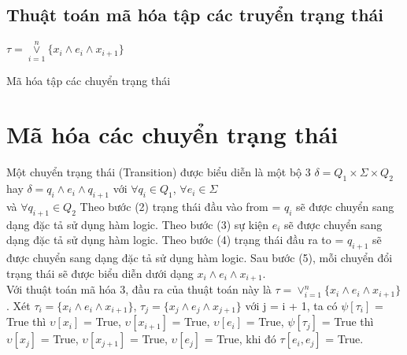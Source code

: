 \documentclass[a4paper,13pt,oneside,openany]{book}
\newenvironment{megaalgorithm}[1][htb]
{\renewcommand{\algorithmcfname}{Thuật toán}%
	\begin{algorithm}[#1]%
}{\end{algorithm}}
\begin{document}
\begin{flushleft}
		\subsection{Thuật toán mã hóa tập các truyển trạng thái}
		\begin{megaalgorithm}[H]
			\SetAlgoLined
			\DontPrintSemicolon
				
			\Return $\tau = \overset{n}{\underset{i=1}{\lor}} \{x_i \land e_i \land x_{i+1}\}$
				
			\caption{Mã hóa tập các chuyển trạng thái}
		\end{megaalgorithm}
		\section{Mã hóa các chuyển trạng thái}
		Một chuyển trạng thái (Transition) được biểu diễn là một bộ 3 $\delta = Q_{1} \times \Sigma \times Q_{2}$ hay $\delta = q_{i} \land e_i \land q_{i+1}$ với $\forall q_{i} \in Q_{1}$, $\forall e_{i} \in \Sigma$\\ và $\forall q_{i+1} \in Q_{2}$
		Theo bước (2) trạng thái đầu vào from = $q_{i}$ sẽ được chuyển sang dạng đặc tả sử dụng hàm logic. Theo bước (3) sự kiện $e_i$ sẽ được chuyển sang dạng đặc tả sử dụng hàm logic. Theo bước (4) trạng thái đầu ra to = $q_{i+1}$ sẽ được chuyển sang dạng đặc tả sử dụng hàm logic. Sau bước (5), mỗi chuyển đổi trạng thái sẽ được biểu diễn dưới dạng $x_{i} \land e_i \land x_{i+1}$.\\
		
		Với thuật toán mã hóa 3, đầu ra của thuật toán này là $\tau = \lor_{i=1}^n \{x_i \land e_i \land x_{i+1}\}$. Xét $\tau_i = \{x_i \land e_i \land x_{i+1}\}$, $\tau_j = \{x_j \land e_j \land x_{j+1}\}$ với j = i + 1, ta có $\psi [\tau_i]$ = True thì $\upsilon[x_i]$ = True, $\upsilon[x_{i+1}]$ = True, $\upsilon[e_i]$ = True, $\psi [\tau_j]$ = True thì $\upsilon[x_j]$ = True, $\upsilon[x_{j+1}]$ = True, $\upsilon[e_j]$ = True, khi đó $\tau [e_i, e_j]$ = True.


\end{flushleft}
\end{document}
